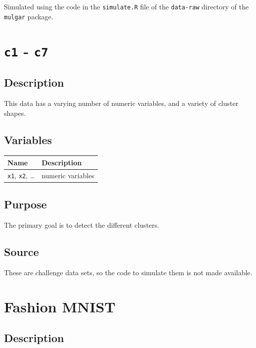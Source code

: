 \documentclass[
  letterpaper,
]{krantz}
\begin{document}
Simulated using the code in the \texttt{simulate.R} file of the
\texttt{data-raw} directory of the \texttt{mulgar} package.

\section{\texorpdfstring{\texttt{c1} -
\texttt{c7}}{c1 - c7}}\label{c1---c7}

\subsection*{Description}\label{description-9}

This data has a varying number of numeric variables, and a variety of
cluster shapes.

\subsection*{Variables}\label{variables-9}

\begin{longtable}[]{@{}ll@{}}
\toprule\noalign{}
Name & Description \\
\midrule\noalign{}
\endhead
\bottomrule\noalign{}
\endlastfoot
\texttt{x1}, \texttt{x2}, \ldots{} & numeric variables \\
\end{longtable}

\subsection*{Purpose}\label{purpose-9}

The primary goal is to detect the different clusters.

\subsection*{Source}\label{source-9}

These are challenge data sets, so the code to simulate them is not made
available.

\section{Fashion MNIST}\label{fashion-mnist}

\subsection*{Description}\label{description-10}
\end{document}
